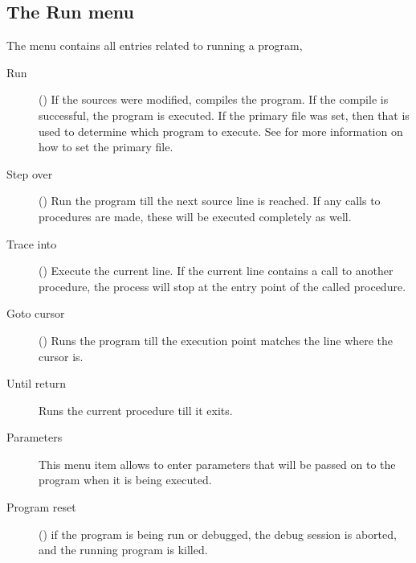 \subsection{The Run menu}
\label{se:menurun}
The  menu contains all entries related to running a program,
\begin{description}
\item[Run] ()
If the sources were modified, compiles the program. If the compile is
successful, the program is executed. If the primary file  was set, then
that is used to determine which program to execute. See 
for more information on how to set the primary file.
\item[Step over] ()
Run the program till the next source line is reached. If any calls to
procedures are made, these will be executed completely as well.
\item[Trace into] ()
Execute the current line. If the current line contains a call to another
procedure, the process will stop at the entry point of the called procedure.
\item[Goto cursor] ()
Runs the program till the execution point matches the line where the cursor
is.
\item[Until return]
Runs the current procedure till it exits.
\item[Parameters]
This menu item allows to enter parameters that will be passed on to the
program when it is being executed.
\item[Program reset] () if the program is being run or
debugged, the debug session is aborted, and the running program is killed.
\end{description}
%
%
